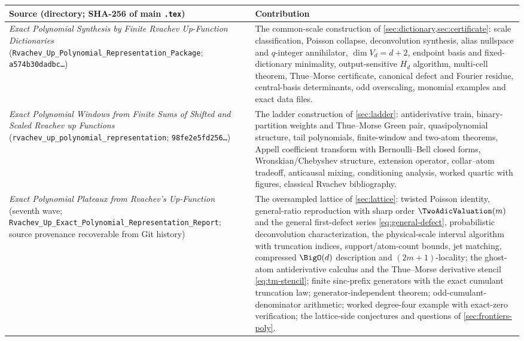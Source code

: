 \documentclass[11pt,oneside]{article}
\numberwithin{equation}{section}
\theoremstyle{definition}
\theoremstyle{remark}
\begin{document}
\begin{center}
\small
\begin{tabular}{@{}p{}p{}@{}}
\toprule
Source (directory; SHA-256 of main \texttt{.tex}) & Contribution \\
\midrule
\emph{Exact Polynomial Synthesis by Finite Rvachev Up-Function
Dictionaries}
(\nolinkurl{Rvachev_Up_Polynomial_Representation_Package};
\texttt{a574b30dadbc\ldots})
& The common-scale construction of
\cref{sec:dictionary,sec:certificate}: scale classification, Poisson
collapse, deconvolution synthesis, alias nullspace and $q$-integer
annihilator, $\dim V_d=d+2$, endpoint basis and fixed-dictionary
minimality, output-sensitive $H_d$ algorithm, multi-cell theorem,
Thue--Morse certificate, canonical defect and Fourier residue,
central-basis determinants, odd overscaling, monomial examples and
exact data files. \\
\addlinespace
\emph{Exact Polynomial Windows from Finite Sums of Shifted and Scaled
Rvachev up Functions}
(\nolinkurl{rvachev_up_polynomial_representation};
\texttt{98fe2e5fd256\ldots})
& The ladder construction of \cref{sec:ladder}: antiderivative train,
binary-partition weights and Thue--Morse Green pair, quasipolynomial
structure, tail polynomials, finite-window and two-atom theorems,
Appell coefficient transform with Bernoulli--Bell closed forms,
Wronskian/Chebyshev structure, extension operator, collar--atom
tradeoff, anticausal mixing, conditioning analysis, worked quartic
with figures, classical Rvachev bibliography. \\
\addlinespace
\emph{Exact Polynomial Plateaux from Rvachev's Up-Function}
(seventh wave;
\nolinkurl{Rvachev_Up_Exact_Polynomial_Representation_Report};
source provenance recoverable from Git history)
& The oversampled lattice of \cref{sec:lattice}: twisted Poisson
identity, general-ratio reproduction with sharp order
$\TwoAdicValuation(m)$ and the general first-defect series
\eqref{eq:general-defect}, probabilistic deconvolution
characterization, the physical-scale interval algorithm with
truncation indices, support/atom-count bounds, jet matching,
compressed $\BigO(d)$ description and $(2m+1)$-locality; the
ghost-atom antiderivative calculus and the Thue--Morse derivative
stencil \eqref{eq:tm-stencil}; finite sinc-prefix generators with
the exact cumulant truncation law; generator-independent theorem;
odd-cumulant-denominator arithmetic; worked degree-four example with
exact-zero verification; the lattice-side conjectures and questions
of \cref{sec:frontiers-poly}. \\
\bottomrule
\end{tabular}
\end{center}
\end{document}
